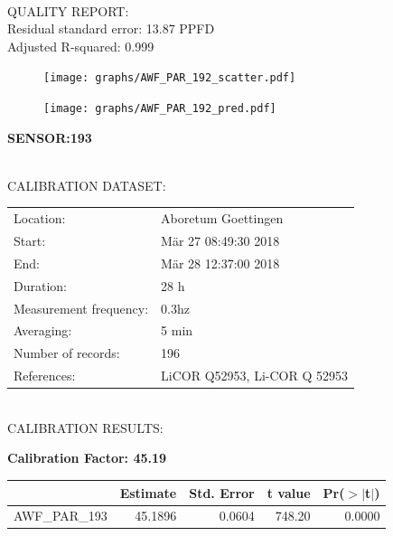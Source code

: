 \documentclass[oneside]{report}
\begin{document}
\hrulefill\\
QUALITY REPORT:\\
Residual standard error: 13.87 PPFD\\
Adjusted R-squared: 0.999



\begin{figure}[H]
  \centering
  \texttt{[image: graphs/AWF\_PAR\_192\_scatter.pdf]}
\end{figure}




\begin{figure}[H]
  \centering
  \texttt{[image: graphs/AWF\_PAR\_192\_pred.pdf]}
\end{figure}

\pagebreak


\begin{center}
\large{\textbf{SENSOR:193}}\\
\end{center}

\hrulefill\\
CALIBRATION DATASET:\\
\begin{table}[h!]
  \centering
  \label{tab:table1}
  \begin{tabular}{ll}
    Location: & Aboretum Goettingen\\ 
    
    
    Start:  & Mär 27 08:49:30 2018 \\
    End:   & Mär 28 12:37:00 2018\\ 
    Duration: & 28 h\\
    Measurement frequency: & 0.3hz\\
    Averaging:  &5 min\\
    Number of records: & 196 \\
    References: & LiCOR Q52953, Li-COR Q 52953 \\
  \end{tabular}
\end{table}

\hrulefill\\
CALIBRATION RESULTS:\\


\begin{center}
\textbf{\large{Calibration Factor: 45.19}}\\
\end{center}
\begin{table}[ht]
\centering
\begin{tabular}{rrrrr}
  \hline
 & Estimate & Std. Error & t value & Pr($>$$|$t$|$) \\ 
  \hline
AWF\_PAR\_193 & 45.1896 & 0.0604 & 748.20 & 0.0000 \\ 
   \hline
\end{tabular}
\end{table}
\end{document}
